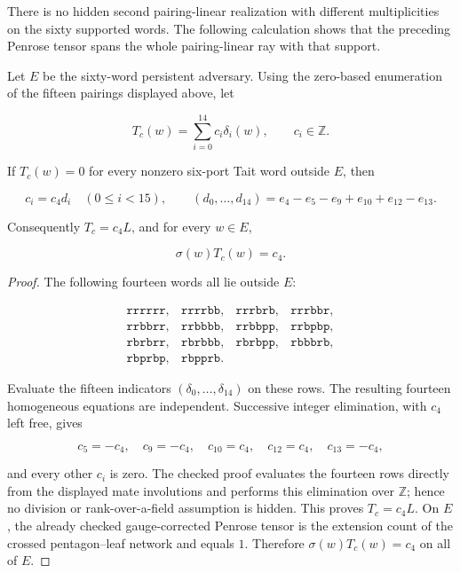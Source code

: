 There is no hidden second pairing-linear realization with different
multiplicities on the sixty supported words.  The following calculation
shows that the preceding Penrose tensor spans the whole pairing-linear ray
with that support.

\begin{proposition}
\label{prop:hexagon-penrose-ray-rigidity}
Let \(E\) be the sixty-word persistent adversary.  Using the zero-based
enumeration of the fifteen pairings displayed above, let

\[
              T_c(w)=\sum_{i=0}^{14}c_i\delta_i(w),
              \qquad c_i\in\mathbb Z.
\]

If \(T_c(w)=0\) for every nonzero six-port Tait word outside \(E\), then

\[
 c_i=c_4d_i\quad(0\leq i<15),\qquad
 (d_0,\ldots,d_{14})
   =e_4-e_5-e_9+e_{10}+e_{12}-e_{13}.
\]

Consequently \(T_c=c_4L\), and for every \(w\in E\),

\[
                         \sigma(w)T_c(w)=c_4.
\]
\end{proposition}

\begin{proof}
The following fourteen words all lie outside \(E\):

\[
\begin{array}{llll}
\mathtt{rrrrrr},&\mathtt{rrrrbb},&\mathtt{rrrbrb},&\mathtt{rrrbbr},\\
\mathtt{rrbbrr},&\mathtt{rrbbbb},&\mathtt{rrbbpp},&\mathtt{rrbpbp},\\
\mathtt{rbrbrr},&\mathtt{rbrbbb},&\mathtt{rbrbpp},&\mathtt{rbbbrb},\\
\mathtt{rbprbp},&\mathtt{rbpprb}.&&
\end{array}
\]

Evaluate the fifteen indicators \((\delta_0,\ldots,\delta_{14})\) on these
rows.  The resulting fourteen
homogeneous equations are independent.  Successive integer elimination,
with \(c_4\) left free, gives

\[
c_5=-c_4,\quad c_9=-c_4,\quad c_{10}=c_4,\quad
c_{12}=c_4,\quad c_{13}=-c_4,
\]

and every other \(c_i\) is zero.  The checked proof evaluates the fourteen
rows directly from the displayed mate involutions and performs this
elimination over \(\mathbb Z\); hence no division or rank-over-a-field
assumption is hidden.  This proves \(T_c=c_4L\).  On \(E\), the already
checked gauge-corrected Penrose tensor is the extension count of the crossed
pentagon--leaf network and equals \(1\).  Therefore
\(\sigma(w)T_c(w)=c_4\) on all of \(E\).
\end{proof}

